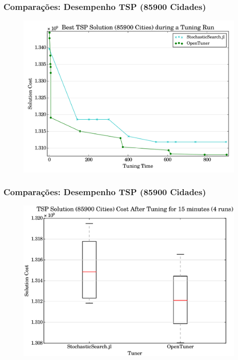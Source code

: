 \documentclass[10pt, compress]{beamer}
\begin{document}
\begin{frame}[fragile]
    \frametitle{Comparações: Desempenho TSP (85900 Cidades)}
    \begin{figure}[H]
        \centering
        \includegraphics[width=1\textwidth]{pla85900_15min_best_comparison}
    \end{figure}%
\end{frame}

\begin{frame}[fragile]
    \frametitle{Comparações: Desempenho TSP (85900 Cidades)}
    \begin{figure}[H]
        \centering
        \includegraphics[width=1\textwidth]{pla85900_15min_comparison}
    \end{figure}%
\end{frame}
\end{document}
